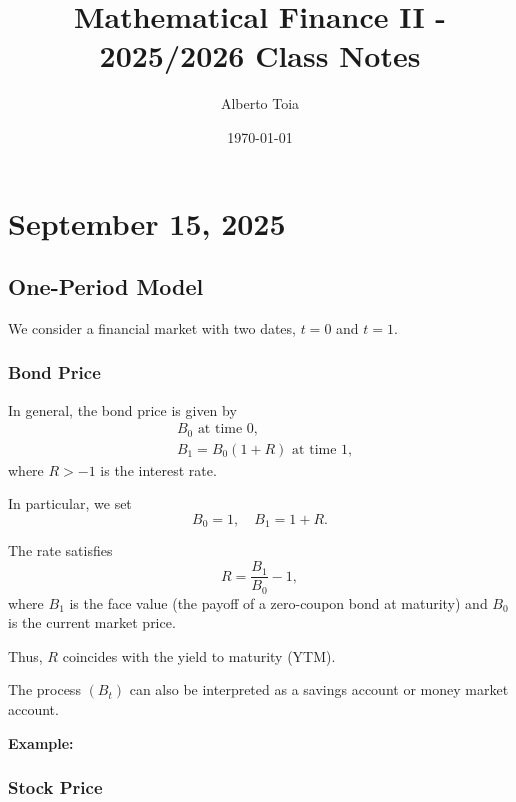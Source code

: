 \documentclass[12pt,a4paper]{article}
\title{Mathematical Finance II - 2025/2026 Class Notes}
\author{Alberto Toia}
\date{\today}
\theoremstyle{definition}
\begin{document}
\maketitle
\tableofcontents
\newpage

\section{September 15, 2025}

\subsection{One-Period Model}

We consider a financial market with two dates, $t = 0$ and $t = 1$.

\subsubsection{Bond Price}

In general, the bond price is given by
\begin{align}
&B_0 \text{ at time } 0, \\
&B_1 = B_0(1 + R) \text{ at time } 1,
\end{align}
where $R > -1$ is the interest rate.

In particular, we set
\[
B_0 = 1, \quad B_1 = 1 + R.
\]

The rate satisfies
\[
R = \frac{B_1}{B_0} - 1,
\]
where $B_1$ is the face value (the payoff of a zero-coupon bond at maturity) and $B_0$ is the current market price.

Thus, $R$ coincides with the yield to maturity (YTM).

The process $(B_t)$ can also be interpreted as a savings account or money market account.

\textbf{Example:}
\begin{center}
\end{center}

\subsubsection{Stock Price}
\end{document}
